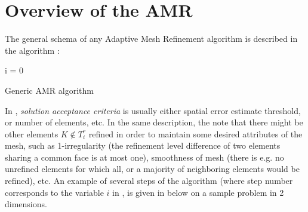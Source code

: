 \section{Overview of the AMR}
The general schema of any Adaptive Mesh Refinement algorithm is described in the algorithm :
\ \\
\begin{algorithm}[H]
 i = 0\\
 \caption{Generic AMR algorithm}
\label{algorithm:AMRGen}
\end{algorithm}
In , \textit{solution acceptance criteria} is usually either spatial error estimate threshold, or number of elements, etc. In the same description, the note that there might be other elements $K \notin T^{r}_i$ refined in order to maintain some desired attributes of the mesh, such as 1-irregularity (the refinement level difference of two elements sharing a common face is at most one), smoothness of mesh (there is e.g. no unrefined elements for which all, or a majority of neighboring elements would be refined), etc.
An example of several steps of the algorithm (where step number corresponds to the variable $i$ in , is given in  below on a sample problem in 2 dimensions.

